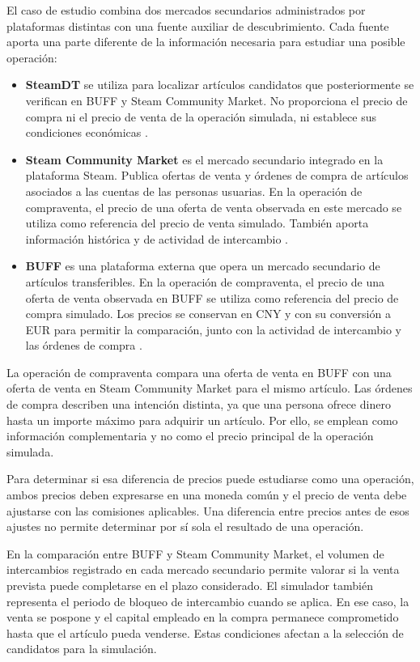 El caso de estudio combina dos mercados secundarios administrados por plataformas distintas con una fuente auxiliar de descubrimiento. Cada fuente aporta una parte diferente de la información necesaria para estudiar una posible operación:
\begin{itemize}
    \item \textbf{SteamDT} se utiliza para localizar artículos candidatos que posteriormente se verifican en BUFF y Steam Community Market. No proporciona el precio de compra ni el precio de venta de la operación simulada, ni establece sus condiciones económicas \cite{steamDT}.
    \item \textbf{Steam Community Market} es el mercado secundario integrado en la plataforma Steam. Publica ofertas de venta y órdenes de compra de artículos asociados a las cuentas de las personas usuarias. En la operación de compraventa, el precio de una oferta de venta observada en este mercado se utiliza como referencia del precio de venta simulado. También aporta información histórica y de actividad de intercambio \cite{steamMarketFAQ}.
    \item \textbf{BUFF} es una plataforma externa que opera un mercado secundario de artículos transferibles. En la operación de compraventa, el precio de una oferta de venta observada en BUFF se utiliza como referencia del precio de compra simulado. Los precios se conservan en CNY y con su conversión a EUR para permitir la comparación, junto con la actividad de intercambio y las órdenes de compra \cite{buffMarketplace}.
\end{itemize}

\clearpage

La operación de compraventa compara una oferta de venta en BUFF con una oferta de venta en Steam Community Market para el mismo artículo. Las órdenes de compra describen una intención distinta, ya que una persona ofrece dinero hasta un importe máximo para adquirir un artículo. Por ello, se emplean como información complementaria y no como el precio principal de la operación simulada.

Para determinar si esa diferencia de precios puede estudiarse como una operación, ambos precios deben expresarse en una moneda común y el precio de venta debe ajustarse con las comisiones aplicables. Una diferencia entre precios antes de esos ajustes no permite determinar por sí sola el resultado de una operación.

En la comparación entre BUFF y Steam Community Market, el volumen de intercambios registrado en cada mercado secundario permite valorar si la venta prevista puede completarse en el plazo considerado. El simulador también representa el periodo de bloqueo de intercambio cuando se aplica. En ese caso, la venta se pospone y el capital empleado en la compra permanece comprometido hasta que el artículo pueda venderse. Estas condiciones afectan a la selección de candidatos para la simulación.

